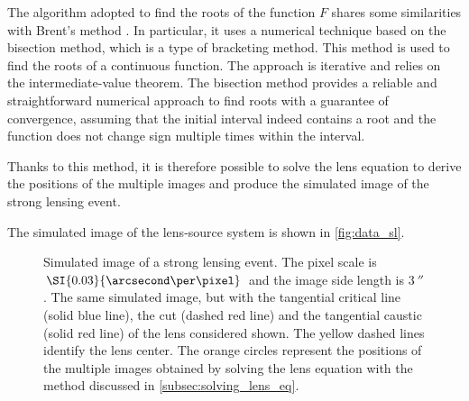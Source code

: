 The algorithm adopted to find the roots of the function $F$ shares some similarities with Brent's method \citep{brent_algorithm_1971}. In particular, it uses a numerical technique based on the bisection method, which is a type of bracketing method. This method is used to find the roots of a continuous function. The approach is iterative and relies on the intermediate-value theorem. The bisection method provides a reliable and straightforward numerical approach to find roots with a guarantee of convergence, assuming that the initial interval indeed contains a root and the function does not change sign multiple times within the interval.

Thanks to this method, it is therefore possible to solve the lens equation to derive the positions of the multiple images and produce the simulated image of the strong lensing event.

The simulated image of the lens-source system is shown in \cref{fig:data_sl}.

\begin{figure}
  \begin{minipage}{\linewidth}
    \centering
  \end{minipage}
  \begin{minipage}{\linewidth}
    \centering
  \end{minipage}
  \caption[Simulated strong lensing event]{\protect{} Simulated image of a strong lensing event. The pixel scale is $\SI{0.03}{\arcsecond\per\pixel}$ and the image side length is $\SI{3}{\arcsecond}$. \protect{} The same simulated image, but with the tangential critical line (solid blue line), the cut (dashed red line) and the tangential caustic (solid red line) of the lens considered shown. The yellow dashed lines identify the lens center. The orange circles represent the positions of the multiple images obtained by solving the lens equation with the method discussed in \cref{subsec:solving_lens_eq}.}
  \label{fig:obs_sl}
\end{figure}


